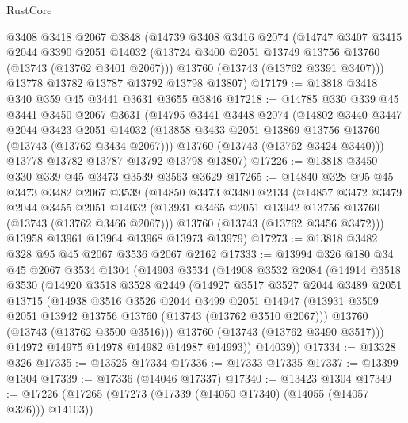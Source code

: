 \begin{lexlean}{RustCore}
\begin{coremodule}
    @3408
    @3418
    @2067
    @3848
    (@14739
      @3408
      @3416
      @2074
      (@14747
        @3407
        @3415
        @2044
        @3390
        @2051
        @14032
        (@13724 @3400 @2051 @13749 @13756 @13760 (@13743 (@13762 @3401 @2067)))
        @13760
        (@13743 (@13762 @3391 @3407)))
      @13778
      @13782
      @13787
      @13792
      @13798
      @13807)
@17179 := @13818 @3418 @340 @359 @45 @3441 @3631 @3655 @3846
@17218 := @14785
    @330
    @339
    @45
    @3441
    @3450
    @2067
    @3631
    (@14795
      @3441
      @3448
      @2074
      (@14802
        @3440
        @3447
        @2044
        @3423
        @2051
        @14032
        (@13858 @3433 @2051 @13869 @13756 @13760 (@13743 (@13762 @3434 @2067)))
        @13760
        (@13743 (@13762 @3424 @3440)))
      @13778
      @13782
      @13787
      @13792
      @13798
      @13807)
@17226 := @13818 @3450 @330 @339 @45 @3473 @3539 @3563 @3629
@17265 := @14840
    @328
    @95
    @45
    @3473
    @3482
    @2067
    @3539
    (@14850
      @3473
      @3480
      @2134
      (@14857
        @3472
        @3479
        @2044
        @3455
        @2051
        @14032
        (@13931 @3465 @2051 @13942 @13756 @13760 (@13743 (@13762 @3466 @2067)))
        @13760
        (@13743 (@13762 @3456 @3472)))
      @13958
      @13961
      @13964
      @13968
      @13973
      @13979)
@17273 := @13818 @3482 @328 @95 @45 @2067 @3536 @2067 @2162
@17333 := @13994
    @326
    @180
    @34
    @45
    @2067
    @3534
    @1304
    (@14903
      @3534
      (@14908
        @3532
        @2084
        (@14914
          @3518
          @3530
          (@14920
            @3518
            @3528
            @2449
            (@14927
              @3517
              @3527
              @2044
              @3489
              @2051
              @13715
              (@14938
                @3516
                @3526
                @2044
                @3499
                @2051
                @14947
                (@13931 @3509 @2051 @13942 @13756 @13760 (@13743 (@13762 @3510 @2067)))
                @13760
                (@13743 (@13762 @3500 @3516)))
              @13760
              (@13743 (@13762 @3490 @3517)))
            @14972
            @14975
            @14978
            @14982
            @14987
            @14993))
        @14039))
@17334 := @13328 @326
@17335 := @13525 @17334
@17336 := @17333 @17335
@17337 := @13399 @1304
@17339 := @17336 (@14046 @17337)
@17340 := @13423 @1304
@17349 := @17226 (@17265 (@17273 (@17339 (@14050 @17340) (@14055 (@14057 @326))) @14103))

\end{coremodule}
\end{lexlean}
